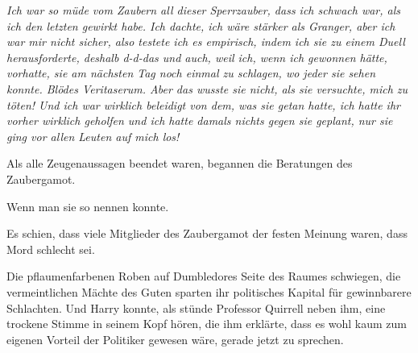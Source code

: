 \emph{Ich war so müde vom Zaubern all dieser Sperrzauber, dass ich schwach war, als ich den letzten gewirkt habe. Ich dachte, ich wäre stärker als Granger, aber ich war mir nicht sicher, also testete ich es empirisch, indem ich sie zu einem Duell herausforderte, deshalb d-d-das und auch, weil ich, wenn ich gewonnen hätte, vorhatte, sie am nächsten Tag noch einmal zu schlagen, wo jeder sie sehen konnte. Blödes Veritaserum. Aber das wusste \emph{sie} nicht, als sie versuchte, mich zu \emph{töten}! Und ich war wirklich beleidigt von dem, was sie getan hatte, ich hatte ihr vorher wirklich geholfen und ich hatte damals nichts gegen sie geplant, nur \emph{sie} ging vor allen Leuten auf \emph{mich} los!}

Als alle Zeugenaussagen beendet waren, begannen die Beratungen des Zaubergamot.

Wenn man sie so nennen konnte.

Es schien, dass viele Mitglieder des Zaubergamot der festen Meinung waren, dass Mord schlecht sei.

Die pflaumenfarbenen Roben auf Dumbledores Seite des Raumes schwiegen, die vermeintlichen Mächte des Guten sparten ihr politisches Kapital für gewinnbarere Schlachten.
Und Harry konnte, als stünde Professor Quirrell neben ihm, eine trockene Stimme in seinem Kopf hören, die ihm erklärte, dass es wohl kaum zum eigenen Vorteil der Politiker gewesen wäre, gerade jetzt zu sprechen.

